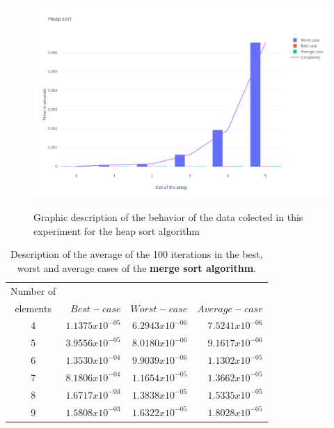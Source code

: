 \documentclass{article}
\begin{document}
\begin{figure}[htp]
	\centering
		\caption{Graphic description of the behavior of the data colected in this experiment for the heap sort algorithm}
	\includegraphics[width=\linewidth]{Heapsort.png}
	\label{ima4}
\end{figure}

     \begin{table}[h!]
\centering
 \caption{Description of the average of the 100 iterations in the best, worst and average cases of the \textbf{merge sort algorithm}. } 
 \label{ta7}
 \begin{tabular} {| c | r | r | r | }
 \hline

Number of 	&		&		&		\\
 elements	&		$	Best-case	$	&	$	Worst-case	$	&	$	Average -case	$	\\
 \hline

4	&	$	1.1375x10^{-05}	$	&	$	6.2943x10^{-06}	$	&	$	7.5241x10^{-06}	$	\\
 \hline
5	&	$	3.9556x10^{-05}	$	&	$	8.0180x10^{-06}	$	&	$	9.1617x10^{-06}	$	\\
 \hline
6	&	$	1.3530x10^{-04}	$	&	$	9.9039x10^{-06}	$	&	$	1.1302x10^{-05}	$	\\
 \hline
7	&	$	8.1806x10^{-04}	$	&	$	1.1654x10^{-05}	$	&	$	1.3662x10^{-05}	$	\\
 \hline
8	&	$	1.6717x10^{-03}	$	&	$	1.3838x10^{-05}	$	&	$	1.5335x10^{-05}	$	\\
 \hline
9	&	$	1.5808x10^{-03}	$	&	$	1.6322x10^{-05}	$	&	$	1.8028x10^{-05}	$	\\
\hline
 \end{tabular}
 \end{table}
\end{document}
